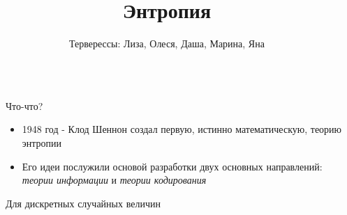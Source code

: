 \documentclass[final]{beamer}
\title{Энтропия} %
\author{Терверессы: Лиза, Олеся, Даша, Марина, Яна} %
\institute{БЭК 171} %
\newlength{\sepwid}
\newlength{\onecolwid}
\begin{document}

\setlength{\belowcaptionskip}{2ex} %
\setlength\belowdisplayshortskip{2ex} %

\begin{frame}[t] %

\begin{columns}[t] %

\begin{column}{\sepwid}\end{column} %

\begin{column}{\onecolwid} %



\begin{alertblock}{Что-что?}
    \begin{itemize}
    \item 1948 год - Клод Шеннон создал первую, истинно математическую, теорию энтропии
    \item Его идеи послужили основой разработки двух основных направлений: \textit{теории информации} и \textit{теории кодирования}
    \end{itemize}
    
    \end{alertblock}

\begin{block}{Для дискретных случайных величин}


\end{block}
\end{column}
\end{columns}
\end{frame}
\end{document}

